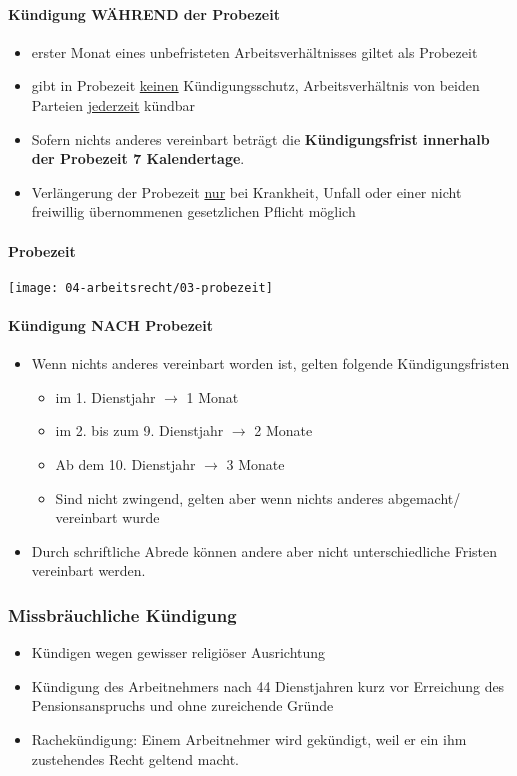 \paragraph{Kündigung WÄHREND der Probezeit}
\begin{itemize}
    \item erster Monat eines unbefristeten Arbeitsverhältnisses giltet als Probezeit
    \item gibt in Probezeit \underline{keinen} Kündigungsschutz, Arbeitsverhältnis von beiden Parteien \underline{jederzeit} kündbar
    \item Sofern nichts anderes vereinbart beträgt die \textbf{Kündigungsfrist innerhalb der Probezeit 7 Kalendertage}.
    \item Verlängerung der Probezeit \underline{nur} bei Krankheit, Unfall oder einer nicht freiwillig übernommenen gesetzlichen Pflicht möglich
\end{itemize}

\paragraph{Probezeit}
\begin{center}
    \texttt{[image: 04-arbeitsrecht/03-probezeit]}
\end{center}

\paragraph{Kündigung NACH Probezeit}
\begin{itemize}
    \item Wenn nichts anderes vereinbart worden ist, gelten folgende Kündigungsfristen
    \begin{itemize}
        \item im 1. Dienstjahr $\rightarrow$ 1 Monat
        \item im 2. bis zum 9. Dienstjahr $\rightarrow$ 2 Monate
        \item Ab dem 10. Dienstjahr $\rightarrow$ 3 Monate
        \item Sind nicht zwingend, gelten aber wenn nichts anderes abgemacht/ vereinbart wurde
    \end{itemize}
    \item Durch schriftliche Abrede können andere aber nicht unterschiedliche Fristen vereinbart werden.
\end{itemize}

\subsubsection{Missbräuchliche Kündigung}
\begin{itemize}
    \item Kündigen wegen gewisser religiöser Ausrichtung
    \item Kündigung des Arbeitnehmers nach 44 Dienstjahren kurz vor Erreichung des Pensionsanspruchs und ohne zureichende Gründe
    \item Rachekündigung: Einem Arbeitnehmer wird gekündigt, weil er ein ihm zustehendes Recht geltend macht.
\end{itemize}

